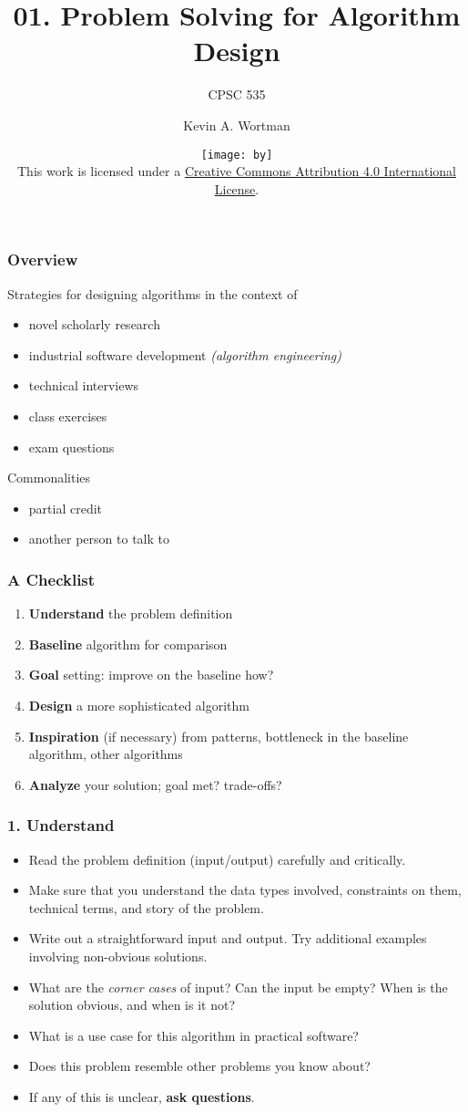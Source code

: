 \documentclass{beamer}
\title{01. Problem Solving for Algorithm Design}
\subtitle{CPSC 535}
\author{Kevin A. Wortman}
\institute{ \texttt{[image: csuf-logo-cmyk]} }
\date{\texttt{[image: by]} \\

{\tiny
This work is licensed under a
\href{http://creativecommons.org/licenses/by/4.0/}{Creative Commons Attribution 4.0 International License}.
}}
\begin{document}
\begin{frame}
  \titlepage
\end{frame}

\begin{frame} \frametitle{Overview}
Strategies for designing algorithms in the context of
\begin{itemize}
  \item novel scholarly research
  \item industrial software development \emph{(algorithm engineering)}
  \item technical interviews
  \item class exercises
  \item exam questions
\end{itemize}

Commonalities
\begin{itemize}
  \item partial credit
  \item another person to talk to
\end{itemize}
\end{frame}

\begin{frame} \frametitle{A Checklist}
  \begin{enumerate}
    \item \textbf{Understand} the problem definition
    \item \textbf{Baseline} algorithm for comparison
    \item \textbf{Goal} setting: improve on the baseline how?
    \item \textbf{Design} a more sophisticated algorithm
    \item \textbf{Inspiration} (if necessary) from patterns, bottleneck in the
      baseline algorithm, other algorithms
    \item \textbf{Analyze} your solution; goal met? trade-offs?
  \end{enumerate}
\end{frame}

\begin{frame} \frametitle{1. Understand}
  \begin{itemize}
    \item Read the problem definition (input/output) carefully and critically.
    \item Make sure that you understand the data types involved, constraints on them,
      technical terms, and story of the problem.
      \item Write out a straightforward input and output. Try additional examples
        involving non-obvious solutions.
    \item What are the \emph{corner cases} of input? Can the input be empty?
      When is the solution obvious, and when is it not?
    \item What is a use case for this algorithm in practical software?
    \item Does this problem resemble other problems you know about?
    \item If any of this is unclear, \textbf{ask questions}.
  \end{itemize}
\end{frame}
\end{document}
